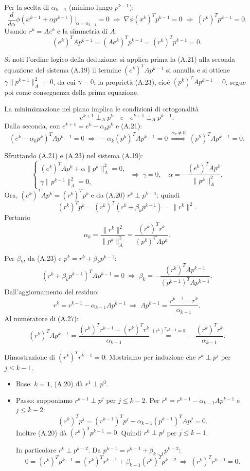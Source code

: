 \documentclass[italian, a4paper, twoside, binding=6mm]{sapthesis}
\begin{document}
Per la scelta di \(\alpha_{k-1}\) (minimo lungo \(p^{k-1}\)):
\[
\frac{d}{d\alpha}\phi(x^{k-1}+\alpha p^{k-1})\big|_{\alpha=\alpha_{k-1}}=0
\;\Longrightarrow\;
\nabla\phi(x^k)^T p^{k-1}=0
\;\Longrightarrow\;
(r^k)^T p^{k-1}=0. \tag{A.20}
\]
Usando \(r^k=Ae^k\) e la simmetria di \(A\):
\[
(e^k)^T A p^{k-1}=(Ae^k)^T p^{k-1}=(r^k)^T p^{k-1}=0. \tag{A.21}
\]

Si noti l'ordine logico della deduzione: si applica prima la (A.21) alla seconda equazione del sistema (A.19) il termine $(e^k)^T A p^{k-1}$ si annulla e si ottiene \(\gamma\|p^{k-1}\|_A^2 = 0\), da cui \(\gamma = 0\); la proprietà (A.23), cioè \((p^k)^T A p^{k-1} = 0\), segue poi come conseguenza della prima equazione.

La minimizzazione nel piano implica le condizioni di ortogonalità
\[
e^{k+1} \perp_A p^k \quad \text{e} \quad e^{k+1} \perp_A p^{k-1}. \tag{A.22}
\]
Dalla seconda, con \(e^{k+1}=e^k-\alpha_k p^k\) e (A.21):
\[
(e^k-\alpha_k p^k)^T A p^{k-1}=0
\;\Longrightarrow\;
-\alpha_k (p^k)^T A p^{k-1}=0
\;\overset{\alpha_k\neq0}{\Longrightarrow}\;
(p^k)^T A p^{k-1}=0. \tag{A.23}
\]

Sfruttando (A.21) e (A.23) nel sistema (A.19):
\[
\begin{cases}
(e^k)^T A p^k+\alpha\|p^k\|_A^2=0,\\
\gamma\|p^{k-1}\|_A^2=0,
\end{cases}
\;\Longrightarrow\;
\gamma=0,\quad
\alpha=-\frac{(e^k)^T A p^k}{\|p^k\|_A^2}. \tag{A.24}
\]
Ora, \((e^k)^T A p^k=(r^k)^T p^k\) e da (A.20) \(r^k\perp p^{k-1}\); quindi
\[
(r^k)^T p^k=(r^k)^T(r^k+\beta_k p^{k-1})=\|r^k\|^2. \tag{A.25}
\]
Pertanto
\[
\alpha_k=\frac{\|r^k\|^2}{\|p^k\|_A^2}
=\frac{(r^k)^T r^k}{(p^k)^T A p^k}. \tag{A.26}
\]

Per \(\beta_k\), da (A.23) e \(p^k=r^k+\beta_k p^{k-1}\):
\[
(r^k+\beta_k p^{k-1})^T A p^{k-1}=0
\;\Longrightarrow\;
\beta_k=-\frac{(r^k)^T A p^{k-1}}{(p^{k-1})^T A p^{k-1}}. \tag{A.27}
\]
Dall'aggiornamento del residuo:
\[
r^k=r^{k-1}-\alpha_{k-1}A p^{k-1}
\;\Longrightarrow\;
A p^{k-1}=\frac{r^{k-1}-r^k}{\alpha_{k-1}}. \tag{A.28}
\]
Al numeratore di (A.27):
\[
(r^k)^T A p^{k-1}
=\frac{(r^k)^T r^{k-1}-(r^k)^T r^k}{\alpha_{k-1}}
\overset{(r^k)^T r^{k-1}=0}{=}
-\frac{(r^k)^T r^k}{\alpha_{k-1}}. \tag{A.29}
\]

Dimostrazione di \((r^k)^T r^{k-1}=0\):  
Mostriamo per induzione che \(r^k\perp p^j\) per \(j\le k-1\).
\begin{itemize}
\item Base: \(k=1\), (A.20) dà \(r^1\perp p^0\).
\item Passo: supponiamo \(r^{k-1}\perp p^j\) per \(j\le k-2\). Per \(r^k=r^{k-1}-\alpha_{k-1}A p^{k-1}\) e \(j\le k-2\):
\[
(r^k)^T p^j=(r^{k-1})^T p^j-\alpha_{k-1}(p^{k-1})^T A p^j=0.
\]
Inoltre (A.20) dà \((r^k)^T p^{k-1}=0\). Quindi \(r^k\perp p^j\) per \(j\le k-1\).

In particolare \(r^k\perp p^{k-2}\). Da \(p^{k-1}=r^{k-1}+\beta_{k-1}p^{k-2}\):
\[
0=(r^k)^T p^{k-1}=(r^k)^T r^{k-1}+\beta_{k-1}(r^k)^T p^{k-2}
\;\Longrightarrow\;
(r^k)^T r^{k-1}=0. \tag{A.30}
\]
\end{itemize}
\end{document}
